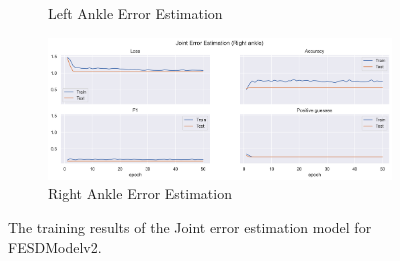 \begin{figure}[!htbp]
\begin{subfigure}[b]{0.47\linewidth}
        \caption{Left Ankle Error Estimation}
        \label{fig:v2_lean_jt_ee}
    \end{subfigure}
    \hfill
    \begin{subfigure}[b]{0.47\linewidth}
        \centering
        \includegraphics[width=\textwidth]{figures/Results/v2/jt/Right ankle_ErrorEstimation.png}
        \caption{Right Ankle Error Estimation}
        \label{fig:v2_rian_jt_ee}
    \end{subfigure}
    \caption[Detailed Training results for the Joint Problem Set]{The training results of the Joint error estimation model for FESDModelv2.}
  \end{figure}